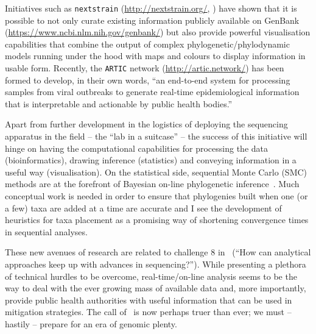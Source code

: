 Initiatives such as \verb|nextstrain| (\url{http://nextstrain.org/}, \cite{Hadfield2017}) have shown that it is possible to not only curate existing information publicly available on GenBank (\url{https://www.ncbi.nlm.nih.gov/genbank/}) but also provide powerful visualisation capabilities that combine the output of complex phylogenetic/phylodynamic models running under the hood with maps and colours to display information in usable form.
Recently, the \verb|ARTIC| network (\url{http://artic.network/}) has been formed to develop, in their own words, ``an end-to-end system for processing samples from viral outbreaks to generate real-time epidemiological information that is interpretable and actionable by public health bodies.'' 

Apart from further development in the logistics of deploying the sequencing apparatus in the field -- the ``lab in a suitcase'' -- the success of this initiative will hinge on having the computational capabilities for processing the data (bioinformatics), drawing inference (statistics) and conveying information in a useful way (visualisation).
On the statistical side, sequential Monte Carlo (SMC) methods are at the forefront of Bayesian on-line phylogenetic inference~\citep{Dinh2016,Fourment2017,Everitt2018}.
Much conceptual work is needed in order to ensure that phylogenies built when one (or a few) taxa are added at a time are accurate and I see the development of heuristics for taxa placement as a promising way of shortening convergence times in sequential analyses.

These new avenues of research are related to challenge 8 in~\cite{Frost2015} (``How can analytical approaches keep up with advances in sequencing?'').
While presenting a plethora of technical hurdles to be overcome, real-time/on-line analysis seems to be the way to deal with the ever growing mass of available data and, more importantly, provide public health authorities with useful information that can be used in mitigation strategies.
The call of~\cite{Pybus2013} is now perhaps truer than ever; we must -- hastily -- prepare for an era of genomic plenty.

% 
